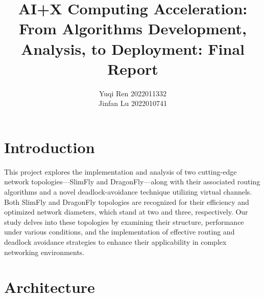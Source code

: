 \documentclass[utf8]{article}
\title{\bf\LARGE AI+X Computing Acceleration: From Algorithms Development, Analysis, to Deployment: Final Report}
\author{Yuqi Ren 2022011332 \\ Jinfan Lu 2022010741}
\date{}
\begin{document}
\maketitle
\thispagestyle{empty}

\section{Introduction}

This project explores the implementation and analysis of two cutting-edge network topologies—SlimFly and DragonFly—along with their associated routing algorithms and a novel deadlock-avoidance technique utilizing virtual channels. Both SlimFly and DragonFly topologies are recognized for their efficiency and optimized network diameters, which stand at two and three, respectively. Our study delves into these topologies by examining their structure, performance under various conditions, and the implementation of effective routing and deadlock avoidance strategies to enhance their applicability in complex networking environments.

\section{Architecture}
\end{document}
